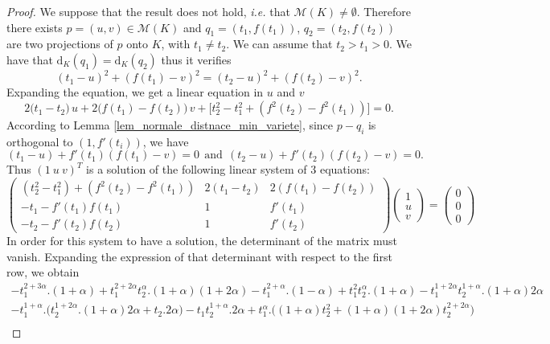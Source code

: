 \documentclass[11pt,reqno,a4paper]{article}%
\theoremstyle{definition}
\theoremstyle{remark}
\renewcommand{\d}{\mathrm{d}}
\renewcommand{\d}{\mathrm{d}}
\begin{document}
\begin{proof}
We suppose that the result does not hold, \textit{i.e.} that $\mathscr{M}(K) \neq \emptyset$. Therefore there exists $p = (u,v) \in \mathscr{M}(K)$ and $q_1 = (t_1, f(t_1))$, $q_2 = (t_2, f(t_2))$ are two projections of $p$ onto $K$, with $t_1\neq t_2$. We can  assume that $t_2 > t_1 > 0$.
We have that $\d_K(q_1) = \d_K(q_2)$ thus it verifies
\begin{equation} \label{eq: 1er_equation_systeme_lin}
    (t_1-u)^2 + (f(t_1)-v)^2 = (t_2-u)^2 + (f(t_2)-v)^2.
\end{equation}
Expanding the equation, we get a linear equation in $u$ and $v$
$$2 \big( t_1 - t_2 \big) \, u + 2 \big( f(t_1) -f(t_2) \big) \, v + \Big[ t_2^2 - t_1^2 + (f^2(t_2) - f^2(t_1)) \Big] = 0 .$$
According to Lemma \ref{lem_normale_distnace_min_variete}, since $p-q_i$ is orthogonal to $(1,f'(t_i))$, we have
\begin{equation} \label{eq: 2eme_equation_systeme_lin}
    (t_1 - u) + f'(t_1) (f(t_1)- v) = 0 ~~ \text{and} ~~ (t_2 - u) + f'(t_2) (f(t_2)- v) = 0.
\end{equation}
Thus $(1\ u\ v)^T$ is a solution of the following linear system of 3 equations:
\[ \begin{pmatrix}
    (t_2^2-t_1^2)+(f^2(t_2)-f^2(t_1)) & 2(t_1-t_2) & 2(f(t_1)-f(t_2))\\
 -t_1-f'(t_1)f(t_1) & 1 &  f'(t_1)\\
 -t_2-f'(t_2)f(t_2) & 1 &  f'(t_2)
\end{pmatrix}
\begin{pmatrix}
    1 \\ u \\ v
\end{pmatrix}
= 
\begin{pmatrix}
    0 \\ 0 \\ 0
\end{pmatrix}
\]
In order for this system to have a solution, the determinant of the matrix must vanish. Expanding the expression of that determinant with respect to the first row, we obtain
\begin{multline*}
    - t_1^{2+3\alpha} . (1 + \alpha) + t_1^{2+2 \alpha} t_2^\alpha . (1 + \alpha) (1+2 \alpha) - t_1^{2+\alpha} . (1 - \alpha) + t_1^2 t_2^\alpha . (1 + \alpha) - t_1^{1 + 2 \alpha} t_2^{1+\alpha} .(1 + \alpha) 2 \alpha\\
    - t_1^{1+\alpha} . \big( t_2^{1+2\alpha} . (1 + \alpha) 2 \alpha  + t_2 . 2 \alpha\big) 
    - t_1 t_2^{1+\alpha} . 2 \alpha + t_1^\alpha . \big( (1 + \alpha)  t_2^2 + (1 + \alpha) (1+2 \alpha) t_2^{2+2\alpha} \big) \\

\end{multline*}
\end{proof}
\end{document}
